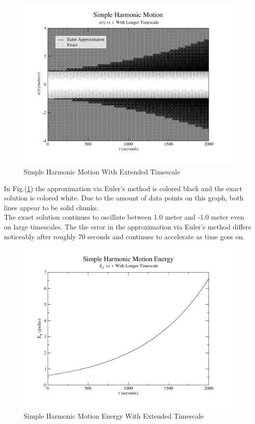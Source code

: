 \documentclass{article}
\begin{document}
\begin{figure}[H]
\begin{center}
\includegraphics[scale=0.59]{./results2000}
\end{center}
\caption{Simple Harmonic Motion With Extended Timescale}
\label{fig:3}
\end{figure} 

\noindent
In Fig.(\ref{fig:3}) the approximation via Euler's method is colored black and the exact solution is colored white. Due to the amount of data points on this graph, both lines appear to be solid chunks.\\

\noindent
The exact solution continues to oscillate between 1.0 meter and -1.0 meter even on large timescales. The the error in the approximation via Euler's method differs noticeably after roughly 70 seconds and continues to accelerate as time goes on.


\begin{figure}[H]
\begin{center}
\includegraphics[scale=0.59]{./conservation2000}
\end{center}
\caption{Simple Harmonic Motion Energy With Extended Timescale}
\label{fig:4}
\end{figure} 
\end{document}
